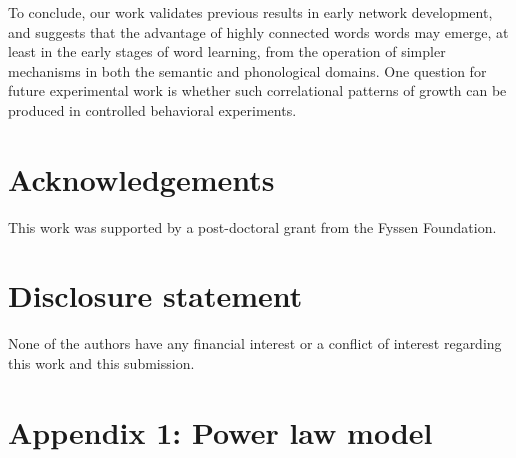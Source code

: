 \documentclass[english,floatsintext,man]{apa6}
\theoremstyle{definition}
\theoremstyle{definition}
\theoremstyle{definition}
\theoremstyle{remark}
\begin{document}
To conclude, our work validates previous results in early network
development, and suggests that the advantage of highly connected words
words may emerge, at least in the early stages of word learning, from
the operation of simpler mechanisms in both the semantic and
phonological domains. One question for future experimental work is
whether such correlational patterns of growth can be produced in
controlled behavioral experiments.

\vspace{1em}

\vspace{1em}

\section{Acknowledgements}\label{acknowledgements}

This work was supported by a post-doctoral grant from the Fyssen
Foundation.

\section{Disclosure statement}\label{disclosure-statement}

None of the authors have any financial interest or a conflict of
interest regarding this work and this submission.

\section{Appendix 1: Power law model}\label{appendix-1-power-law-model}
\end{document}
